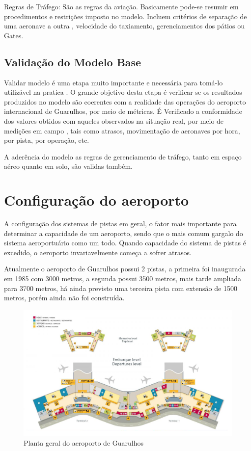 \documentclass[12pt]{article}
\begin{document}
  Regras de Tráfego: São as regras da aviação. Basicamente pode-se resumir
  em procedimentos e restrições imposto no modelo. Incluem critérios de 
  separação de uma aeronave a outra , velocidade do taxiamento, gerenciamentos
  dos pátios ou Gates.
  
  
  \subsection{Validação do Modelo Base}
  Validar modelo é uma etapa muito importante e necessária para tomá-lo 
  utilizável na pratica . O grande objetivo desta etapa é verificar se os
  resultados produzidos no modelo são coerentes com a realidade das operações
  do aeroporto internacional de Guarulhos, por meio de métricas. 
  É Verificado a conformidade dos valores obtidos com aqueles observados na
  situação real, por meio de medições em campo , tais como atrasos,
  movimentação de aeronaves por hora, por pista, por operação, etc.
  
  A aderência do modelo as regras de gerenciamento de tráfego, tanto em espaço
  aéreo quanto em solo, são validas também.
  
  
  \section{Configuração do aeroporto}

  A configuração dos sistemas de pistas em geral, o fator mais importante
  para determinar a capacidade de um aeroporto, sendo que o mais comum 
  gargalo do sistema aeroportuário como um todo. Quando capacidade do 
  sistema de pistas é excedido, o aeroporto invariavelmente começa a 
  sofrer atrasos.
  
  Atualmente o aeroporto de Guarulhos possui 2 pistas, a primeira foi 
  inaugurada em 1985 com  3000 metros, a segunda possui 3500 metros, 
  mais tarde ampliada para 3700 metros, há ainda previsto uma terceira
  pista com extensão de 1500 metros, porém ainda não foi construída. 
  
  \begin{figure}[h!]
    \centering
    \includegraphics[width=.9\textwidth]{aeroporto.png}
    \caption{Planta geral do aeroporto de Guarulhos}
    \label{fig:aeropoto}
  \end{figure}
\end{document}
